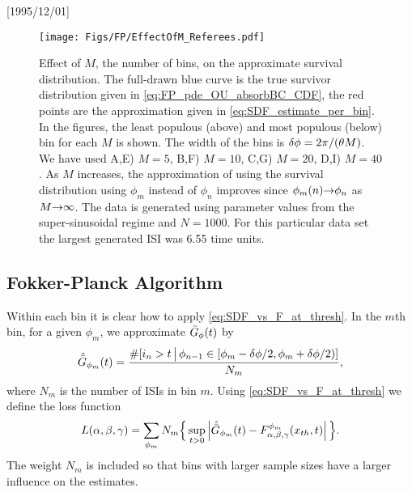 \NeedsTeXFormat{LaTeX2e}[1995/12/01] \documentclass[10pt]{bmc_article}
\newenvironment{bmcformat}{\begin{raggedright}\baselineskip20pt\sloppy\setboolean{publ}{false}}{\end{raggedright}\baselineskip20pt\sloppy}
\begin{document}
\begin{bmcformat}
\begin{figure}[h]
\begin{center}
\texttt{[image: Figs/FP/EffectOfM\_Referees.pdf]}
\caption{Effect of $M$, the number of bins, on the approximate survival
distribution. The full-drawn blue curve is the true survivor distribution
given in \cref{eq:FP_pde_OU_absorbBC_CDF}, the red points are the approximation
given in \cref{eq:SDF_estimate_per_bin}.  
In the figures, the least populous (above) and most populous (below) bin for
each $M$ is shown. The width of the bins is ${ \delta \phi } = {2\pi}/{({\theta} M)}$.
We have used A,E) $M=5$, B,F) $M=10$, C,G) $M=20$,
D,I) $M=40$. As $M$ increases, the approximation of using the survival
distribution using $\phi_m$ instead of $\phi_n$ improves since $\phi_m(n) {\rightarrow}
\phi_n$ as $M {\rightarrow} \infty$. The data is generated using parameter
values from the super-sinusoidal regime and $N=1000$. For this
particular data set the largest generated ISI was 6.55 time units.}
\label{fig:effect_of_M}
\end{center}
\end{figure}

\subsection{Fokker-Planck Algorithm}
Within each bin it is clear how to apply \cref{eq:SDF_vs_F_at_thresh}. In the
$m$th bin, for a given $\phi_m$, we approximate ${ \bar{G} }_{\phi}(t)$  by
\begin{equation}
{ \hat{{ \bar{G} }} }_{\phi_m}(t) =
 \frac{\#[i_n > t \, \big| \, \phi_{n-1} \in [\phi_m - { \delta \phi }/2,
\phi_m + { \delta \phi }/2) ]}{N_m},
\label{eq:SDF_estimate_per_bin}
\end{equation}
where $N_m$ is the number of ISIs in bin $m$. Using \cref{eq:SDF_vs_F_at_thresh}
we define the loss function
\begin{equation}
L({\alpha},{\beta},{\gamma }) = 
\sum_{\phi_m} N_m \Big\{ 
\sup_{t>0} \left| { \hat{{ \bar{G} }} }_{\phi_m}(t) - F^{\phi_m}_{{\alpha},{\beta},{\gamma }}({ x_{th} },
t) \right| \Big \}.
\label{eq:loss_function_absorbingBC}
\end{equation}
The weight $N_m$ is included so that bins with larger sample sizes have a
larger influence on the estimates. 
 

\end{bmcformat}
\end{document}
